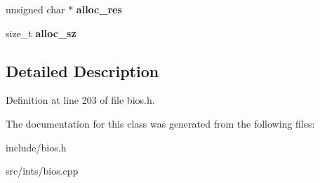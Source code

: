 \begin{DoxyCompactItemize}
\item 
\hypertarget{classISAPnPDevice_ab7645d92be95729a5f745d0735342296}{unsigned char $\ast$ {\bfseries alloc\-\_\-res}}\label{classISAPnPDevice_ab7645d92be95729a5f745d0735342296}

\item 
\hypertarget{classISAPnPDevice_ae872e27861732e57001057215332f53f}{size\-\_\-t {\bfseries alloc\-\_\-sz}}\label{classISAPnPDevice_ae872e27861732e57001057215332f53f}

\end{DoxyCompactItemize}


\subsection{Detailed Description}


Definition at line 203 of file bios.\-h.



The documentation for this class was generated from the following files\-:\begin{DoxyCompactItemize}
\item 
include/bios.\-h\item 
src/ints/bios.\-cpp\end{DoxyCompactItemize}
